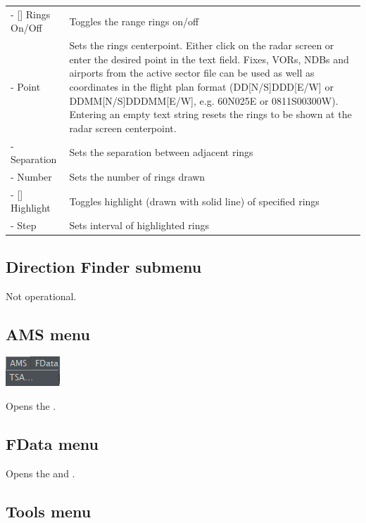 \documentclass[11pt,a4paper]{memoir}
\begin{document}
\begin{tabular}{l l}
    - [] Rings On/Off & Toggles the range rings on/off\\
    - Point & Sets the rings centerpoint. Either click on the radar screen or enter the desired point in the text field. Fixes, VORs, NDBs and airports from the active sector file can be used as well as coordinates in the flight plan format (DD[N/S]DDD[E/W] or DDMM[N/S]DDDMM[E/W], e.g. 60N025E or 0811S00300W). Entering an empty text string resets the rings to be shown at the radar screen centerpoint.\\
    - Separation & Sets the separation between adjacent rings\\
    - Number & Sets the number of rings drawn\\
    - [] Highlight & Toggles highlight (drawn with solid line) of specified rings\\
    - Step & Sets interval of highlighted rings\\
\end{tabular}

\subsection*{Direction Finder submenu}

Not operational.

\subsection{AMS menu}
\label{menu:ams}

\includegraphics{img/AMS.png}

Opens the \textit{}.

\subsection{FData menu}
\label{menu:fdata}

Opens the \textit{} and \textit{}.

\subsection{Tools menu}
\label{menu:tools}
\end{document}
